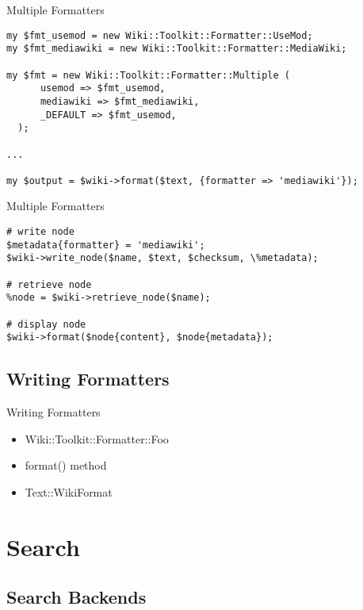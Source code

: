 \begin{frame}[fragile]{Multiple Formatters}
\begin{lstlisting}
my $fmt_usemod = new Wiki::Toolkit::Formatter::UseMod;
my $fmt_mediawiki = new Wiki::Toolkit::Formatter::MediaWiki;

my $fmt = new Wiki::Toolkit::Formatter::Multiple (
      usemod => $fmt_usemod,
      mediawiki => $fmt_mediawiki,
      _DEFAULT => $fmt_usemod,
  );

...

my $output = $wiki->format($text, {formatter => 'mediawiki'});
\end{lstlisting}
\end{frame}

\begin{frame}[fragile]{Multiple Formatters}
\begin{lstlisting}
# write node
$metadata{formatter} = 'mediawiki';
$wiki->write_node($name, $text, $checksum, \%metadata);

# retrieve node
%node = $wiki->retrieve_node($name);

# display node
$wiki->format($node{content}, $node{metadata});
\end{lstlisting}
\end{frame}

\subsection{Writing Formatters}


\begin{frame}{Writing Formatters}
 \begin{itemize}
   \item Wiki::Toolkit::Formatter::Foo
   \item format() method
   \item Text::WikiFormat
 \end{itemize}
\end{frame}

\section{Search}

\subsection{Search Backends}



